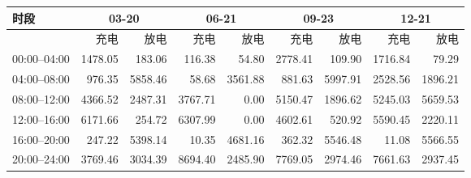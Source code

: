 \begin{tabular}{lrrrrrrrr}
\toprule
时段 & \multicolumn{2}{c}{03-20} & \multicolumn{2}{c}{06-21} & \multicolumn{2}{c}{09-23} & \multicolumn{2}{c}{12-21} \\
\midrule
 & 充电 & 放电 & 充电 & 放电 & 充电 & 放电 & 充电 & 放电 \\
00:00--04:00 & 1478.05 & 183.06 & 116.38 & 54.80 & 2778.41 & 109.90 & 1716.84 & 79.29 \\
04:00--08:00 & 976.35 & 5858.46 & 58.68 & 3561.88 & 881.63 & 5997.91 & 2528.56 & 1896.21 \\
08:00--12:00 & 4366.52 & 2487.31 & 3767.71 & 0.00 & 5150.47 & 1896.62 & 5245.03 & 5659.53 \\
12:00--16:00 & 6171.66 & 254.72 & 6307.99 & 0.00 & 4602.61 & 520.92 & 5590.45 & 2220.11 \\
16:00--20:00 & 247.22 & 5398.14 & 10.35 & 4681.16 & 362.32 & 5546.48 & 11.08 & 5566.55 \\
20:00--24:00 & 3769.46 & 3034.39 & 8694.40 & 2485.90 & 7769.05 & 2974.46 & 7661.63 & 2937.45 \\
\bottomrule
\end{tabular}